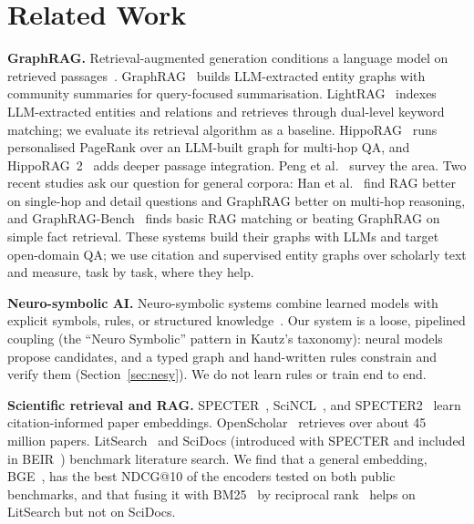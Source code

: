 \documentclass[conference]{IEEEtran}
\begin{document}
\section{Related Work}

\textbf{GraphRAG.} Retrieval-augmented generation conditions a language model on retrieved passages~\cite{lewis2020rag}. GraphRAG~\cite{edge2024graphrag} builds LLM-extracted entity graphs with community summaries for query-focused summarisation. LightRAG~\cite{guo2025lightrag} indexes LLM-extracted entities and relations and retrieves through dual-level keyword matching; we evaluate its retrieval algorithm as a baseline. HippoRAG~\cite{gutierrez2024hipporag} runs personalised PageRank over an LLM-built graph for multi-hop QA, and HippoRAG~2~\cite{gutierrez2025hipporag2} adds deeper passage integration. Peng et al.~\cite{peng2024graphragsurvey} survey the area. Two recent studies ask our question for general corpora: Han et al.~\cite{han2025ragvsgraphrag} find RAG better on single-hop and detail questions and GraphRAG better on multi-hop reasoning, and GraphRAG-Bench~\cite{xiang2026whengraphs} finds basic RAG matching or beating GraphRAG on simple fact retrieval. These systems build their graphs with LLMs and target open-domain QA; we use citation and supervised entity graphs over scholarly text and measure, task by task, where they help.

\textbf{Neuro-symbolic AI.} Neuro-symbolic systems combine learned models with explicit symbols, rules, or structured knowledge~\cite{garcez2023neurosymbolic,kautz2022third}. Our system is a loose, pipelined coupling (the ``Neuro\,\textbar\,Symbolic'' pattern in Kautz's taxonomy): neural models propose candidates, and a typed graph and hand-written rules constrain and verify them (Section~\ref{sec:nesy}). We do not learn rules or train end to end.

\textbf{Scientific retrieval and RAG.} SPECTER~\cite{cohan2020specter}, SciNCL~\cite{ostendorff2022scincl}, and SPECTER2~\cite{singh2023scirepeval} learn citation-informed paper embeddings. OpenScholar~\cite{asai2026openscholar} retrieves over about 45 million papers. LitSearch~\cite{ajith2024litsearch} and SciDocs (introduced with SPECTER and included in BEIR~\cite{thakur2021beir}) benchmark literature search. We find that a general embedding, BGE~\cite{xiao2024cpack}, has the best NDCG@10 of the encoders tested on both public benchmarks, and that fusing it with BM25~\cite{robertson2009bm25} by reciprocal rank~\cite{cormack2009rrf} helps on LitSearch but not on SciDocs.
\end{document}
